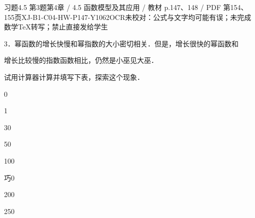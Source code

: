 \begin{bankitem}{习题4.5 第3题}{第4章 / 4.5 函数模型及其应用 / 教材 p.147、148 / PDF 第154、155页}{XJ-B1-C04-HW-P147-Y1062}{OCR未校对：公式与文字均可能有误；未完成数学TeX转写；禁止直接发给学生}
\begin{ocrdraft}
\par
3．幂函数的增长快慢和幂指数的大小密切相关．但是，增长很快的幂函数和
\par
增长比较慢的指数函数相比，仍然是小巫见大巫．
\par
试用计算器计算并填写下表，探索这个现象．
\par
0
\par
1
\par
30
\par
50
\par
100
\par
巧0
\par
200
\par
250
\par
[教材p.148 / PDF第155页]
\end{ocrdraft}
\end{bankitem}
